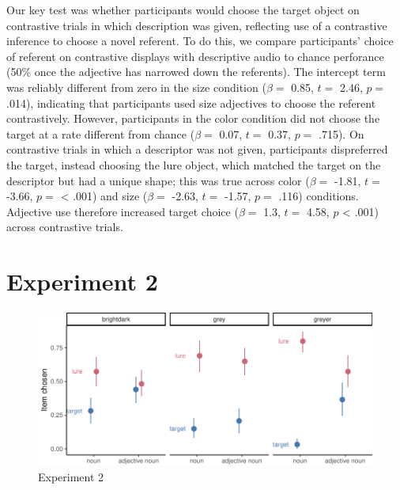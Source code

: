 \documentclass[10pt, letterpaper]{article}
\newenvironment{CodeChunk}{}{}
\begin{document}
Our key test was whether participants would choose the target object on
contrastive trials in which description was given, reflecting use of a
contrastive inference to choose a novel referent. To do this, we compare
participants' choice of referent on contrastive displays with
descriptive audio to chance perforance (50\% once the adjective has
narrowed down the referents). The intercept term was reliably different
from zero in the size condition (\(\beta =\) 0.85, \(t =\) 2.46, \(p =\)
.014), indicating that participants used size adjectives to choose the
referent contrastively. However, participants in the color condition did
not choose the target at a rate different from chance (\(\beta =\) 0.07,
\(t =\) 0.37, \(p =\) .715). On contrastive trials in which a descriptor
was not given, participants dispreferred the target, instead choosing
the lure object, which matched the target on the descriptor but had a
unique shape; this was true across color (\(\beta =\) -1.81, \(t =\)
-3.66, \(p =\) \textless{} .001) and size (\(\beta =\) -2.63, \(t =\)
-1.57, \(p =\) .116) conditions. Adjective use therefore increased
target choice (\(\beta =\) 1.3, \(t =\) 4.58, \(p\) \textless{} .001)
across contrastive trials.

\section{Experiment 2}\label{experiment-2}

\begin{CodeChunk}
\begin{figure}[tb]

{\centering \includegraphics{figs/e2_fig-1} 

}

\caption[Experiment 2]{Experiment 2}\label{fig:e2_fig}
\end{figure}
\end{CodeChunk}
\end{document}
